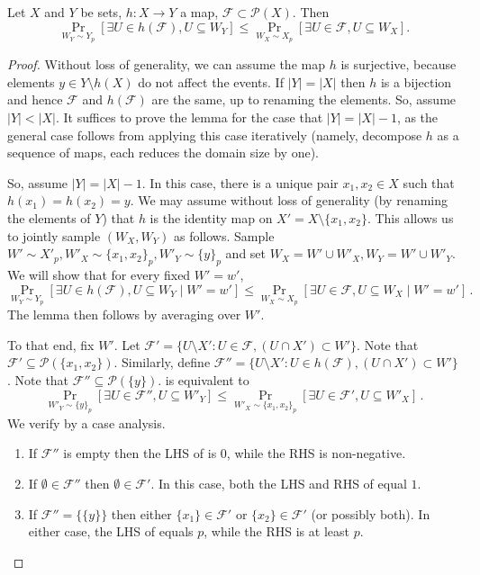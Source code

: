 \documentclass{toc}
\newcommand{\calF}{\mathcal{F}} %
\begin{document}
\begin{lemma}
\label{lemma:compress}
Let $X$ and $Y$ be sets, $h:X \to Y$ a map, $\calF \subset \mathcal{P}(X)$.
Then
$$
\Pr_{W_{Y}\sim Y_{p}}[\exists U\in h(\calF), U\subseteq W_{Y}]\leq
\Pr_{W_{X}\sim X_{p}}[\exists U\in\calF, U\subseteq W_{X}].
$$
\end{lemma}

\begin{proof}
Without loss of generality, we can assume the map $h$ is surjective, because elements $y\in Y\setminus h(X)$ do not affect the events.
If $|Y|=|X|$ then $h$ is a bijection and hence $\calF$ and $h(\calF)$ are the same, up to renaming the elements.
So, assume $|Y|<|X|$. It suffices to prove the lemma for the case that $|Y|=|X|-1$, as the general case follows from applying this case iteratively
(namely, decompose $h$ as a sequence of maps, each reduces the domain size by one).

So, assume $|Y|=|X|-1$. In this case, there is a unique pair $x_1,x_2 \in X$ such that $h(x_1)=h(x_2)=y$. We may assume without loss of generality
(by renaming the elements of $Y$) that $h$ is the identity map on $X'=X \setminus \{x_1,x_2\}$.
This allows us to jointly sample $(W_X,W_Y)$ as follows.
Sample $W' \sim X'_p, W'_X \sim \{x_1,x_2\}_p, W'_Y \sim \{y\}_p$ and set $W_X = W' \cup W'_X, W_Y = W' \cup W'_Y$.
We will show that for every fixed $W'=w'$,
\begin{equation}
\label{eq:XY}
\Pr_{W_{Y}\sim Y_{p}}[\exists U \in h(\calF), U \subseteq W_{Y} \; | \; W'=w']\leq
\Pr_{W_{X}\sim X_{p}}[\exists U \in\calF, U\subseteq W_{X} \; | \; W'=w']\,.
\end{equation}
The lemma then follows by averaging over $W'$.

To that end, fix $W'$. Let $\mathcal{F'} = \{U \setminus X': U \in \calF, (U \cap X') \subset W'\}$.
Note that $\mathcal{F'} \subseteq \mathcal{P}(\{x_1,x_2\})$. Similarly, define
$\mathcal{F''}  = \{U \setminus X': U \in h(\calF), (U \cap X') \subset W'\}$.
Note that $\mathcal{F''} \subseteq \mathcal{P}(\{y\})$.  is equivalent to
\begin{equation}
\label{eq:XY2}
\Pr_{W'_{Y}\sim \{y\}_{p}}[\exists U \in \mathcal{F''} , U \subseteq W'_{Y}]\leq
\Pr_{W'_{X}\sim \{x_1,x_2\}_{p}}[\exists U\in\mathcal{F'}, U \subseteq W'_{X}]\,.
\end{equation}
We verify  by a case analysis.
\begin{enumerate}
\item[(i)] If $\mathcal{F''}$ is empty then the LHS of  is $0$, while the RHS is non-negative.
\item[(ii)] If $\emptyset \in \mathcal{F''}$ then $\emptyset \in \mathcal{F'}$. In this case, both the LHS and RHS of
 equal $1$.
\item[(iii)] If $\mathcal{F''} = \{\{y\}\}$ then either $\{x_1\} \in \mathcal{F'}$ or $\{x_2\} \in \mathcal{F'}$ (or possibly both).
In either case, the LHS of  equals $p$, while the RHS is at least $p$.
\end{enumerate}
\end{proof}
\end{document}
